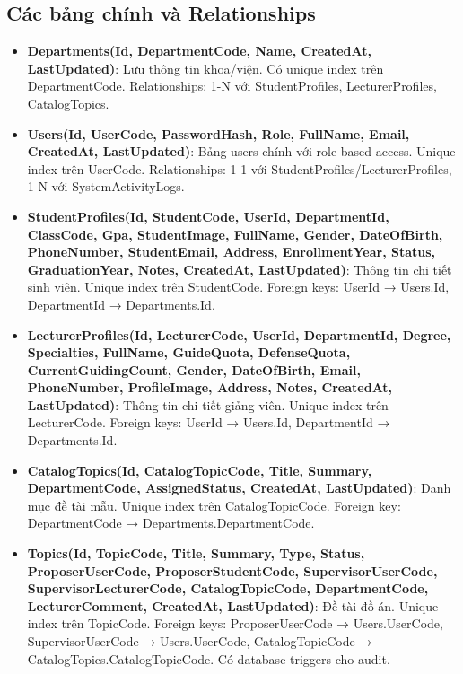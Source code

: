 \documentclass[conference,a4paper]{IEEEtran}
\begin{document}
\subsection{Các bảng chính và Relationships}

\begin{itemize}
  \item \textbf{Departments(Id, DepartmentCode, Name, CreatedAt, LastUpdated)}: Lưu thông tin khoa/viện. Có unique index trên DepartmentCode. Relationships: 1-N với StudentProfiles, LecturerProfiles, CatalogTopics.
  
  \item \textbf{Users(Id, UserCode, PasswordHash, Role, FullName, Email, CreatedAt, LastUpdated)}: Bảng users chính với role-based access. Unique index trên UserCode. Relationships: 1-1 với StudentProfiles/LecturerProfiles, 1-N với SystemActivityLogs.
  
  \item \textbf{StudentProfiles(Id, StudentCode, UserId, DepartmentId, ClassCode, Gpa, StudentImage, FullName, Gender, DateOfBirth, PhoneNumber, StudentEmail, Address, EnrollmentYear, Status, GraduationYear, Notes, CreatedAt, LastUpdated)}: Thông tin chi tiết sinh viên. Unique index trên StudentCode. Foreign keys: UserId → Users.Id, DepartmentId → Departments.Id.
  
  \item \textbf{LecturerProfiles(Id, LecturerCode, UserId, DepartmentId, Degree, Specialties, FullName, GuideQuota, DefenseQuota, CurrentGuidingCount, Gender, DateOfBirth, Email, PhoneNumber, ProfileImage, Address, Notes, CreatedAt, LastUpdated)}: Thông tin chi tiết giảng viên. Unique index trên LecturerCode. Foreign keys: UserId → Users.Id, DepartmentId → Departments.Id.
  
  \item \textbf{CatalogTopics(Id, CatalogTopicCode, Title, Summary, DepartmentCode, AssignedStatus, CreatedAt, LastUpdated)}: Danh mục đề tài mẫu. Unique index trên CatalogTopicCode. Foreign key: DepartmentCode → Departments.DepartmentCode.
  
  \item \textbf{Topics(Id, TopicCode, Title, Summary, Type, Status, ProposerUserCode, ProposerStudentCode, SupervisorUserCode, SupervisorLecturerCode, CatalogTopicCode, DepartmentCode, LecturerComment, CreatedAt, LastUpdated)}: Đề tài đồ án. Unique index trên TopicCode. Foreign keys: ProposerUserCode → Users.UserCode, SupervisorUserCode → Users.UserCode, CatalogTopicCode → CatalogTopics.CatalogTopicCode. Có database triggers cho audit.
  

\end{itemize}
\end{document}
